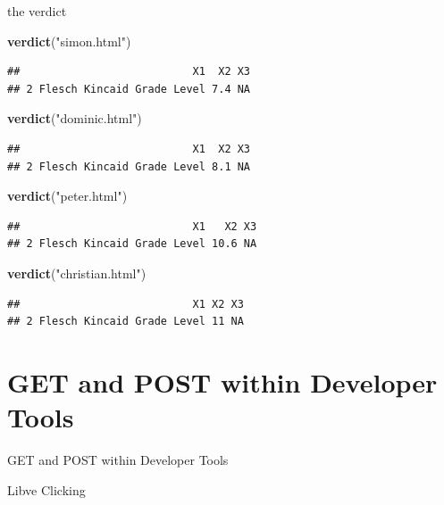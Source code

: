 \documentclass[ignorenonframetext,]{beamer}
\newenvironment{Shaded}{\begin{snugshade}}{\end{snugshade}}
\newcommand{\KeywordTok}[1]{\textcolor[rgb]{0.13,0.29,0.53}{\textbf{{#1}}}}
\newcommand{\StringTok}[1]{\textcolor[rgb]{0.31,0.60,0.02}{{#1}}}
\newcommand{\NormalTok}[1]{{#1}}
\begin{document}
\begin{frame}[fragile]{the verdict}

\begin{Shaded}
\begin{Highlighting}[]
\KeywordTok{verdict}\NormalTok{(}\StringTok{"simon.html"}\NormalTok{)}
\end{Highlighting}
\end{Shaded}

\begin{verbatim}
##                           X1  X2 X3
## 2 Flesch Kincaid Grade Level 7.4 NA
\end{verbatim}

\begin{Shaded}
\begin{Highlighting}[]
\KeywordTok{verdict}\NormalTok{(}\StringTok{"dominic.html"}\NormalTok{)}
\end{Highlighting}
\end{Shaded}

\begin{verbatim}
##                           X1  X2 X3
## 2 Flesch Kincaid Grade Level 8.1 NA
\end{verbatim}

\begin{Shaded}
\begin{Highlighting}[]
\KeywordTok{verdict}\NormalTok{(}\StringTok{"peter.html"}\NormalTok{)}
\end{Highlighting}
\end{Shaded}

\begin{verbatim}
##                           X1   X2 X3
## 2 Flesch Kincaid Grade Level 10.6 NA
\end{verbatim}

\begin{Shaded}
\begin{Highlighting}[]
\KeywordTok{verdict}\NormalTok{(}\StringTok{"christian.html"}\NormalTok{)}
\end{Highlighting}
\end{Shaded}

\begin{verbatim}
##                           X1 X2 X3
## 2 Flesch Kincaid Grade Level 11 NA
\end{verbatim}

\end{frame}

\section{GET and POST within Developer
Tools}\label{get-and-post-within-developer-tools}

\begin{frame}{GET and POST within Developer Tools}

Libve Clicking

\end{frame}
\end{document}

